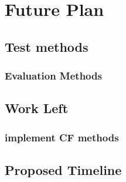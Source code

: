 \chapter{Future Plan}\label{C:future}


\section{Test methods}
\subsection{Evaluation Methods}



\section{Work Left}

\subsection{implement CF methods}


\section{Proposed Timeline}


